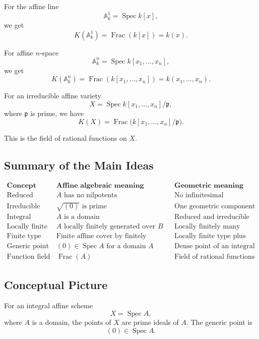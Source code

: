 \documentclass[12pt,a4paper]{article}
\theoremstyle{notespace}
\begin{document}
For the affine line
\[
\mathbb{A}^1_k=\operatorname{Spec}k[x],
\]
we get
\[
K(\mathbb{A}^1_k)=\operatorname{Frac}(k[x])=k(x).
\]

For affine \(n\)-space
\[
\mathbb{A}^n_k=\operatorname{Spec}k[x_1,\dots,x_n],
\]
we get
\[
K(\mathbb{A}^n_k)
=
\operatorname{Frac}(k[x_1,\dots,x_n])
=
k(x_1,\dots,x_n).
\]

For an irreducible affine variety
\[
X=\operatorname{Spec}k[x_1,\dots,x_n]/\mathfrak{p},
\]
where \(\mathfrak{p}\) is prime, we have
\[
K(X)
=
\operatorname{Frac}\bigl(k[x_1,\dots,x_n]/\mathfrak{p}\bigr).
\]

This is the field of rational functions on \(X\).

\subsection{Summary of the Main Ideas}

\[
\begin{array}{c|c|c}
	\textbf{Concept} & \textbf{Affine algebraic meaning} & \textbf{Geometric meaning} \\
	\hline
	\text{Reduced} &
	A \text{ has no nilpotents} &
	\text{No infinitesimal thickening}
	\\
	\hline
	\text{Irreducible} &
	\sqrt{(0)} \text{ is prime} &
	\text{One geometric component}
	\\
	\hline
	\text{Integral} &
	A \text{ is a domain} &
	\text{Reduced and irreducible}
	\\
	\hline
	\text{Locally finite type} &
	A \text{ locally finitely generated over } B &
	\text{Locally finitely many parameters}
	\\
	\hline
	\text{Finite type} &
	\text{Finite affine cover by finitely generated algebras} &
	\text{Locally finite type plus quasi-compactness}
	\\
	\hline
	\text{Generic point} &
	(0)\in \operatorname{Spec}A \text{ for a domain } A &
	\text{Dense point of an integral scheme}
	\\
	\hline
	\text{Function field} &
	\operatorname{Frac}(A) &
	\text{Field of rational functions}
\end{array}
\]

\subsection{Conceptual Picture}

For an integral affine scheme
\[
X=\operatorname{Spec}A,
\]
where \(A\) is a domain, the points of \(X\) are prime ideals of \(A\). The generic point is
\[
(0)\in \operatorname{Spec}A.
\]
\end{document}
